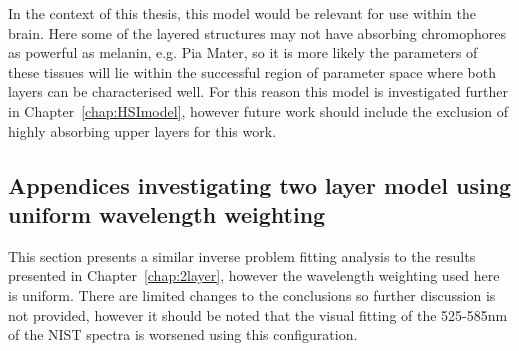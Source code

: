 In the context of this thesis, this model would be relevant for use within the brain. Here some of the layered structures may not have absorbing chromophores as powerful as melanin, e.g. Pia Mater, so it is more likely the parameters of these tissues will lie within the successful region of parameter space where both layers can be characterised well. For this reason this model is investigated further in Chapter~\ref{chap:HSImodel}, however future work should include the exclusion of highly absorbing upper layers for this work. 

% 
% 

% 

% 
\clearpage
\begin{subappendices}
    \section{Appendices investigating two layer model using uniform wavelength weighting}\label{ap:2layeruniform}
This section presents a similar inverse problem fitting analysis to the results presented in Chapter~\ref{chap:2layer}, however the wavelength weighting used here is uniform. There are limited changes to the conclusions so further discussion is not provided, however it should be noted that the visual fitting of the 525-585nm of the NIST spectra is worsened using this configuration.


\end{subappendices}
